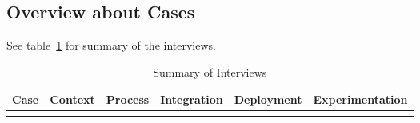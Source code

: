 \documentclass[english]{tktltiki2}
\begin{document}
\subsection{Overview about Cases}

See table~\ref{table:summary-of-interviews} for summary of the interviews.


\begin{landscape}

    \footnotesize

    \begin{longtable}{|p{2.5cm}|p{1.5cm}|p{4cm}|p{4cm}|p{4cm}|p{4cm}|}

        \caption{Summary of Interviews} \\

        \hline

        \textbf{Case} & \textbf{Context} & \textbf{Process} & \textbf{Integration} & \textbf{Deployment} & \textbf{Experimentation} \\

        \hline

        \endhead

        \label{table:summary-of-interviews}


\end{longtable}
\end{landscape}
\end{document}
